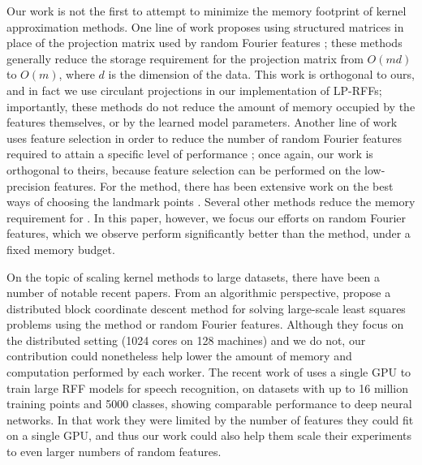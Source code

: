 Our work is not the first to attempt to minimize the memory footprint of kernel approximation methods.  One line of work proposes using structured matrices in place of the projection matrix used by random Fourier features \citep{fastfood,yu15,sphereRKS}; these methods generally reduce the storage requirement for the projection matrix from $O(md)$ to $O(m)$, where $d$ is the dimension of the data. This work is orthogonal to ours, and in fact we use circulant projections \citep{yu15} in our implementation of LP-RFFs; importantly, these methods do not reduce the amount of memory occupied by the features themselves, or by the learned model parameters. Another line of work uses feature selection in order to reduce the number of random Fourier features required to attain a specific level of performance \citep{sparseRKS, may2016}; once again, our work is orthogonal to theirs, because feature selection can be performed on the low-precision features.  For the \Nystrom method, there has been extensive work on the best ways of choosing the landmark points \citep{kmeans08,kumar12,gittens13}.  Several other methods reduce the memory requirement for \Nystrom \cite{ensemble09,fastpred14,meka14}. In this paper, however, we focus our efforts on random Fourier features, which we observe perform significantly better than the \Nystrom method, under a fixed memory budget.

On the topic of scaling kernel methods to large datasets, there have been a number of notable recent papers.  From an algorithmic perspective, \citet{block16} propose a distributed block coordinate descent method for solving large-scale least squares problems using the \Nystrom method or random Fourier features. Although they focus on the distributed setting (1024 cores on 128 machines) and we do not, our contribution could nonetheless help lower the amount of memory and computation performed by each worker.  The recent work of \citet{may2017} uses a single GPU to train large RFF models for speech recognition, on datasets with up to 16 million training points and 5000 classes, showing comparable performance to deep neural networks. In that work they were limited by the number of features they could fit on a single GPU, and thus our work could also help them scale their experiments to even larger numbers of random features.

